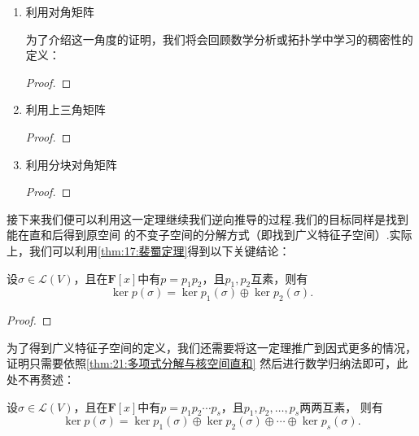 \begin{enumerate}
    \item 利用对角矩阵
    
    为了介绍这一角度的证明，我们将会回顾数学分析或拓扑学中学习的稠密性的定义：
    \begin{definition}
        
    \end{definition}

    \begin{lemma}
        
    \end{lemma}

    \begin{proof}
        
    \end{proof}

    \item 利用上三角矩阵
    
    \begin{proof}
        
    \end{proof}

    \item 利用分块对角矩阵
        
    \begin{proof}
        
    \end{proof}
\end{enumerate}

接下来我们便可以利用这一定理继续我们逆向推导的过程.我们的目标同样是找到能在直和后得到原空间
的不变子空间的分解方式（即找到广义特征子空间）.实际上，我们可以利用\autoref{thm:17:裴蜀定理}得到以下关键结论：
\begin{theorem} \label{thm:21:多项式分解与核空间直和}
    设$\sigma\in \mathcal{L}(V)$，且在$\mathbf{F}[x]$中有$p=p_1p_2$，且$p_1,p_2$互素，则有
    \[\ker p(\sigma)=\ker p_1(\sigma)\oplus\ker p_2(\sigma).\]
\end{theorem}
\begin{proof}
    
\end{proof}

为了得到广义特征子空间的定义，我们还需要将这一定理推广到因式更多的情况，
证明只需要依照\autoref{thm:21:多项式分解与核空间直和} 然后进行数学归纳法即可，此处不再赘述：
\begin{theorem} \label{thm:21:多项式分解与核空间直和2}
    设$\sigma\in \mathcal{L}(V)$，且在$\mathbf{F}[x]$中有$p=p_1p_2\cdots p_s$，且$p_1,p_2,\ldots,p_s$两两互素，
    则有\[\ker p(\sigma)=\ker p_1(\sigma)\oplus\ker p_2(\sigma)\oplus\cdots\oplus\ker p_s(\sigma).\]
\end{theorem}

